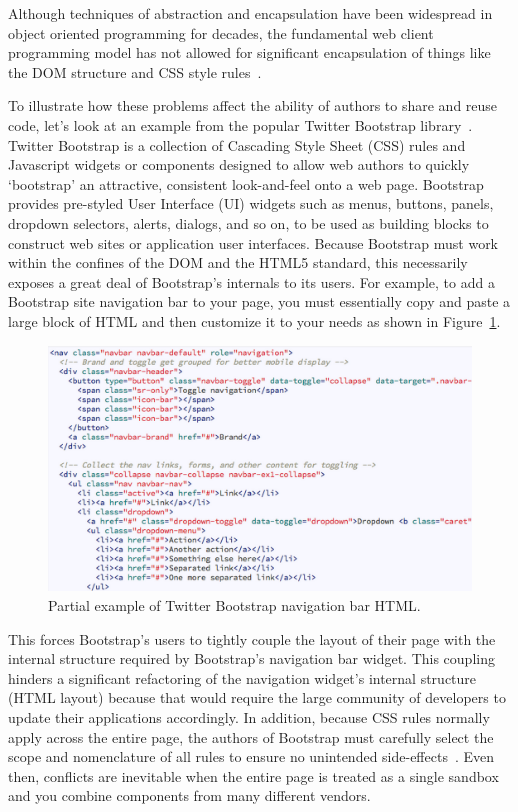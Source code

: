 Although techniques of abstraction and encapsulation have been widespread in object oriented programming for decades,
the fundamental web client programming model has not allowed for significant encapsulation of things like the DOM structure and CSS style rules~\cite{ihrig2012}.

To illustrate how these problems affect the ability of authors to share and reuse code, let's look at an example from the popular Twitter Bootstrap library~\cite{bootstrapcontributors2015}.
Twitter Bootstrap is a collection of Cascading Style Sheet (CSS) rules and Javascript widgets or components designed to allow web authors to quickly `bootstrap' an attractive, consistent look-and-feel onto a web page.
Bootstrap provides pre-styled User Interface (UI) widgets such as menus, buttons, panels, dropdown selectors, alerts, dialogs, and so on, to be used as building blocks to construct web sites or application user interfaces.
Because Bootstrap must work within the confines of the DOM and the HTML5 standard, this necessarily exposes a great deal of Bootstrap's internals to its users.
For example, to add a Bootstrap site navigation bar to your page, you must essentially copy and paste a large block of HTML and then customize it to your needs as shown in Figure~\ref{f:twbs1}.

\begin{figure}[htb]
\centering
 \includegraphics[width=6in]{images/bootstrap_navbar_html.png}
\caption{Partial example of Twitter Bootstrap navigation bar HTML.}
\label{f:twbs1}
\end{figure}


This forces Bootstrap's users to tightly couple the layout of their page with the internal structure required by Bootstrap's navigation bar widget. 
This coupling hinders a significant refactoring of the navigation widget's internal structure (HTML layout) because that would require the large community of developers to update their applications accordingly.
In addition, because CSS rules normally apply across the entire page, the authors of Bootstrap must carefully select the scope and nomenclature of all rules to ensure no unintended side-effects~\cite{walton2014}. 
Even then, conflicts are inevitable when the entire page is treated as a single sandbox and you combine components from many different vendors. 

